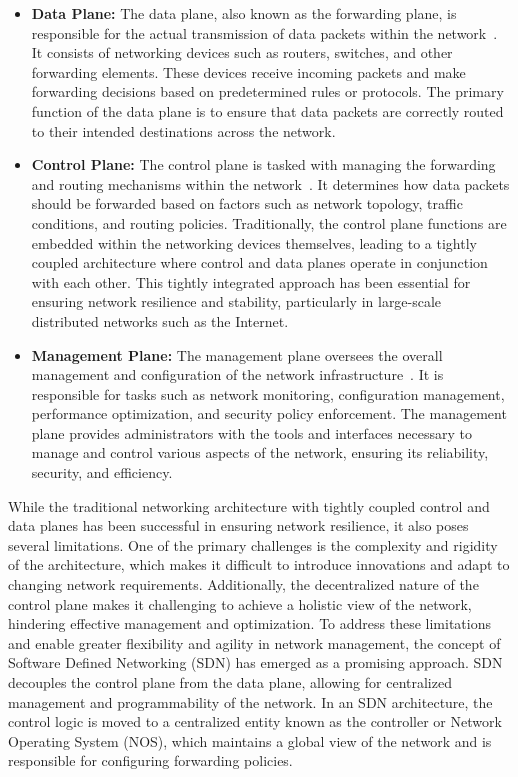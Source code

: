 \begin{itemize}
\item  \textbf{Data Plane:} The data plane, also known as the forwarding plane, is responsible for the actual transmission of data packets within the network~\cite{tr2016sdn}. It consists of networking devices such as routers, switches, and other forwarding elements. These devices receive incoming packets and make forwarding decisions based on predetermined rules or protocols. The primary function of the data plane is to ensure that data packets are correctly routed to their intended destinations across the network.
\item  \textbf{Control Plane:} The control plane is tasked with managing the forwarding and routing mechanisms within the network~\cite{tr2016sdn}. It determines how data packets should be forwarded based on factors such as network topology, traffic conditions, and routing policies. Traditionally, the control plane functions are embedded within the networking devices themselves, leading to a tightly coupled architecture where control and data planes operate in conjunction with each other. This tightly integrated approach has been essential for ensuring network resilience and stability, particularly in large-scale distributed networks such as the Internet.
\item \textbf{Management Plane:} The management plane oversees the overall management and configuration of the network infrastructure~\cite{tr2016sdn}. It is responsible for tasks such as network monitoring, configuration management, performance optimization, and security policy enforcement. The management plane provides administrators with the tools and interfaces necessary to manage and control various aspects of the network, ensuring its reliability, security, and efficiency.
\end{itemize}

While the traditional networking architecture with tightly coupled control and data planes has been successful in ensuring network resilience, it also poses several limitations. One of the primary challenges is the complexity and rigidity of the architecture, which makes it difficult to introduce innovations and adapt to changing network requirements. Additionally, the decentralized nature of the control plane makes it challenging to achieve a holistic view of the network, hindering effective management and optimization.
To address these limitations and enable greater flexibility and agility in network management, the concept of Software Defined Networking (SDN) has emerged as a promising approach. SDN decouples the control plane from the data plane, allowing for centralized management and programmability of the network. In an SDN architecture, the control logic is moved to a centralized entity known as the controller or Network Operating System (NOS), which maintains a global view of the network and is responsible for configuring forwarding policies.

